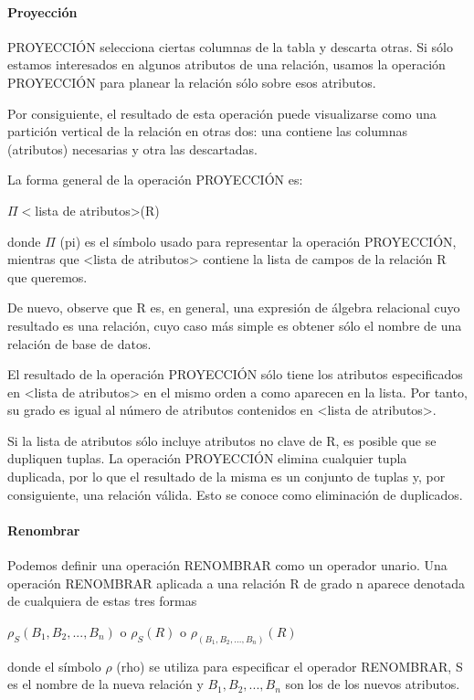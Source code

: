 \paragraph{Proyección}


PROYECCIÓN selecciona ciertas columnas de la tabla y descarta otras. Si sólo estamos interesados en algunos atributos de una relación, usamos la operación PROYECCIÓN para planear la relación sólo sobre esos atributos. 


Por consiguiente, el resultado de esta operación puede visualizarse como una partición vertical de la relación en otras dos: una contiene las columnas (atributos) necesarias y otra las descartadas. 

La forma general de la operación PROYECCIÓN es:


$\Pi<$lista de atributos>(R)


donde $\Pi$ (pi) es el símbolo usado para representar la operación PROYECCIÓN, mientras que <lista de atributos> contiene la lista de campos de la relación R que queremos. 


De nuevo, observe que R es, en general, una expresión de álgebra relacional cuyo resultado es una relación, cuyo caso más simple es obtener sólo el nombre de una relación de base de datos.


El resultado de la operación PROYECCIÓN sólo tiene los atributos especificados en <lista de atributos> en el mismo orden a como aparecen en la lista. Por tanto, su grado es igual al número de atributos contenidos en <lista de atributos>.


Si la lista de atributos sólo incluye atributos no clave de R, es posible que se dupliquen tuplas. La operación PROYECCIÓN elimina cualquier tupla duplicada, por lo que el resultado de la misma es un conjunto de tuplas y, por consiguiente, una relación válida. Esto se conoce como eliminación de duplicados.

\paragraph{Renombrar}

Podemos definir una operación RENOMBRAR como un operador unario. Una operación RENOMBRAR
aplicada a una relación R de grado n aparece denotada de cualquiera de estas tres formas


$\rho_S (B_1,B_2,...,B_n)$ o $\rho_S (R)$ o $\rho_{(B_1,B_2,...,B_n)}(R)$


donde el símbolo $\rho$ (rho) se utiliza para especificar el operador RENOMBRAR, S es el nombre de la nueva relación y $B_{1} , B_{2} ,..., B_{n}$ son los de los nuevos atributos.



